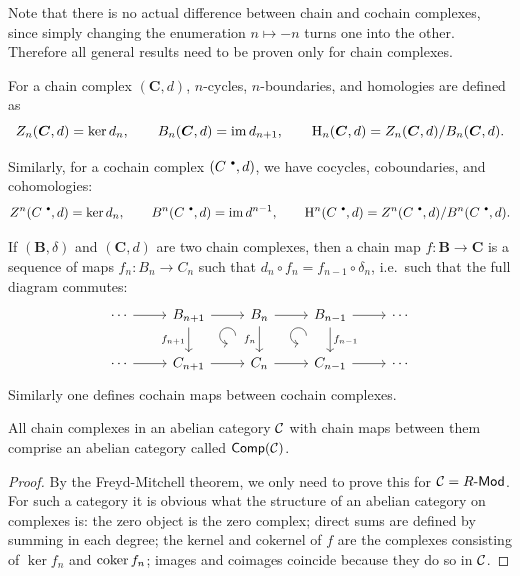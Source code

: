 Note that there is no actual difference between chain and cochain complexes, since simply changing the enumeration $n\mapsto -n$ turns one into the other. Therefore all general results need to be proven only for chain complexes.

\begin{defn}
    For a chain complex $(\bm{C},d)$, $n$-cycles, $n$-boundaries, and homologies are defined as 
    \[Z_n(\boldsymbol{C},d)=\ker d_n,\quad\quad B_n(\boldsymbol{C},d)=\operatorname{im} d_{n+1},\quad\quad \mathrm{H}_n(\boldsymbol{C},d)=Z_n(\boldsymbol{C},d)/B_n(\boldsymbol{C},d).\]
    
    Similarly, for a cochain complex $(C^{\smbullet },d)$, we have cocycles, coboundaries, and cohomologies:
    \[Z^n(C^{\smbullet },d)=\ker d_n,\quad\quad B^n(C^{\smbullet },d)=\im d^{n-1},\quad\quad \rmH^n(C^{\smbullet },d)=Z^n(C^{\smbullet },d)/B^n(C^{\smbullet },d).\]
\end{defn}

\begin{defn}
    If $(\bm{B},\delta )$ and $(\bm{C},d)$ are two chain complexes, then a chain map $f:\bm{B}\to \bm{C}$ is a sequence of maps $f_n:B_n\to C_n$ such that $d_n\circ f_n=f_{n-1}\circ \delta_n$, i.e.\ such that the full diagram commutes:
    \[\begin{tikzcd}[every matrix/.append style={name=m},
        execute at end picture={\draw [<-] ([xshift=-8mm,yshift=-10mm]m-1-3.north) arc[start angle=-90,delta angle=-270,radius=0.2cm];
        \draw [<-] ([xshift=-8mm,yshift=-10mm]m-1-4.north) arc[start angle=-90,delta angle=-270,radius=0.2cm];}]
        \cdots\arrow[r] & B_{n+1}\arrow[r]\arrow[d,swap,"f_{n+1}"] & B_{n} \arrow[r]\arrow[d,swap,"f_n"] & B_{n-1}\arrow[d,"f_{n-1}"]\arrow[r] & \cdots \\
       \cdots\arrow[r] & C_{n+1}\arrow[r] & C_n\arrow[r] &C_{n-1} \arrow[r] &\cdots
    \end{tikzcd}\]
    Similarly one defines cochain maps between cochain complexes.
\end{defn}

\begin{prop}
    All chain complexes in an abelian category $\mathcal{C}$ with chain maps between them comprise an abelian category called $\mathsf{Comp}(\mathcal{C})$.
\end{prop}
\begin{proof}
    By the Freyd-Mitchell theorem, we only need to prove this for $\mathcal{C}=R\text{-}\mathsf{Mod}$. For such a category it is obvious what the structure of an abelian category on complexes is: the zero object is the zero complex; direct sums are defined by summing in each degree; the kernel and cokernel of $f$ are the complexes consisting of $\ker f_n$ and $\operatorname{coker} f_n$; images and coimages coincide because they do so in $\mathcal{C}$.
\end{proof}

